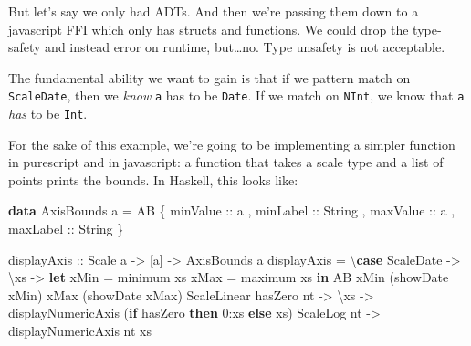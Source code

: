 \documentclass[]{article}
\newenvironment{Shaded}{}{}
\newcommand{\DataTypeTok}[1]{\textcolor[rgb]{0.56,0.13,0.00}{#1}}
\newcommand{\DecValTok}[1]{\textcolor[rgb]{0.25,0.63,0.44}{#1}}
\newcommand{\FunctionTok}[1]{\textcolor[rgb]{0.02,0.16,0.49}{#1}}
\newcommand{\KeywordTok}[1]{\textcolor[rgb]{0.00,0.44,0.13}{\textbf{#1}}}
\newcommand{\NormalTok}[1]{#1}
\newcommand{\OperatorTok}[1]{\textcolor[rgb]{0.40,0.40,0.40}{#1}}
\newcommand{\OtherTok}[1]{\textcolor[rgb]{0.00,0.44,0.13}{#1}}
\begin{document}
But let's say we only had ADTs. And then we're passing them down to a javascript
FFI which only has structs and functions. We could drop the type-safety and
instead error on runtime, but\ldots no. Type unsafety is not acceptable.

The fundamental ability we want to gain is that if we pattern match on
\texttt{ScaleDate}, then we \emph{know} \texttt{a} has to be \texttt{Date}. If
we match on \texttt{NInt}, we know that \texttt{a} \emph{has} to be
\texttt{Int}.

For the sake of this example, we're going to be implementing a simpler function
in purescript and in javascript: a function that takes a scale type and a list
of points prints the bounds. In Haskell, this looks like:

\begin{Shaded}
\begin{Highlighting}[]
\KeywordTok{data} \DataTypeTok{AxisBounds}\NormalTok{ a }\OtherTok{=} \DataTypeTok{AB}
\NormalTok{    \{}\OtherTok{ minValue ::}\NormalTok{ a}
\NormalTok{    ,}\OtherTok{ minLabel ::} \DataTypeTok{String}
\NormalTok{    ,}\OtherTok{ maxValue ::}\NormalTok{ a}
\NormalTok{    ,}\OtherTok{ maxLabel ::} \DataTypeTok{String}
\NormalTok{    \}}

\OtherTok{displayAxis ::} \DataTypeTok{Scale}\NormalTok{ a }\OtherTok{{-}\textgreater{}}\NormalTok{ [a] }\OtherTok{{-}\textgreater{}} \DataTypeTok{AxisBounds}\NormalTok{ a}
\NormalTok{displayAxis }\OtherTok{=}\NormalTok{ \textbackslash{}}\KeywordTok{case}
    \DataTypeTok{ScaleDate} \OtherTok{{-}\textgreater{}}\NormalTok{ \textbackslash{}xs }\OtherTok{{-}\textgreater{}}
      \KeywordTok{let}\NormalTok{ xMin }\OtherTok{=} \FunctionTok{minimum}\NormalTok{ xs}
\NormalTok{          xMax }\OtherTok{=} \FunctionTok{maximum}\NormalTok{ xs}
       \KeywordTok{in} \DataTypeTok{AB}\NormalTok{ xMin (showDate xMin) xMax (showDate xMax)}
    \DataTypeTok{ScaleLinear}\NormalTok{ hasZero nt }\OtherTok{{-}\textgreater{}}\NormalTok{ \textbackslash{}xs }\OtherTok{{-}\textgreater{}}
\NormalTok{      displayNumericAxis (}\KeywordTok{if}\NormalTok{ hasZero }\KeywordTok{then} \DecValTok{0}\OperatorTok{:}\NormalTok{xs }\KeywordTok{else}\NormalTok{ xs)}
    \DataTypeTok{ScaleLog}\NormalTok{ nt }\OtherTok{{-}\textgreater{}}
\NormalTok{      displayNumericAxis nt xs}


\end{Highlighting}
\end{Shaded}
\end{document}
